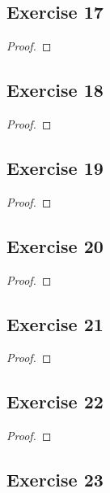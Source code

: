 \documentclass[14pt]{extarticle}
\begin{document}
\subsection{Exercise 17}

\begin{proof}

\end{proof}

\subsection{Exercise 18}

\begin{proof}

\end{proof}

\subsection{Exercise 19}

\begin{proof}

\end{proof}

\subsection{Exercise 20}

\begin{proof}

\end{proof}

\subsection{Exercise 21}

\begin{proof}

\end{proof}

\subsection{Exercise 22}

\begin{proof}

\end{proof}

\subsection{Exercise 23}
\end{document}
